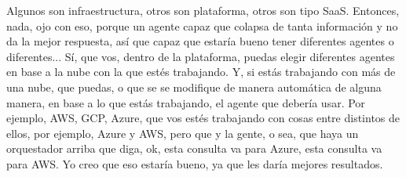 Algunos son infraestructura, otros son plataforma, otros son tipo SaaS. Entonces, nada, ojo con eso, porque un agente capaz que colapsa de tanta información y no da la mejor respuesta, así que capaz que estaría bueno tener diferentes agentes o diferentes... Sí, que vos, dentro de la plataforma, puedas elegir diferentes agentes en base a la nube con la que estés trabajando. Y, si estás trabajando con más de una nube, que puedas, o que se se modifique de manera automática de alguna manera, en base a lo que estás trabajando, el agente que debería usar. Por ejemplo, AWS, GCP, Azure, que vos estés trabajando con cosas entre distintos de ellos, por ejemplo, Azure y AWS, pero que y la gente, o sea, que haya un orquestador arriba que diga, ok, esta consulta va para Azure, esta consulta va para AWS. Yo creo que eso estaría bueno, ya que les daría mejores resultados.
